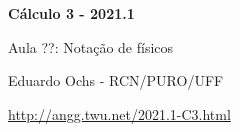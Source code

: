 \documentclass[oneside,12pt]{article}
\begin{document}


\long{}
\long{}
\long{}
\long{}
\long{}
\long{}
\long{}
\long{}
\long{}
\long{}
\long{}

\long{}
\long{}

\def\frown{\ensuremath{{=}{(}}}
\def\True {\mathbf{V}}
\def\False{\mathbf{F}}
\def\D    {\displaystyle}

\def\drafturl{http://angg.twu.net/LATEX/2021-1-C3.pdf}
\def\drafturl{http://angg.twu.net/2021.1-C3.html}
\def\draftfooter{\tiny \href{\drafturl}{\jobname{}} \ColorBrown{\shorttoday{} \hours}}



%

\thispagestyle{empty}

\begin{center}

\vspace*{1.2cm}

{\bf \Large Cálculo 3 - 2021.1}

\bsk

Aula ??: Notação de físicos

\bsk

Eduardo Ochs - RCN/PURO/UFF

\url{http://angg.twu.net/2021.1-C3.html}

\end{center}
\end{document}
